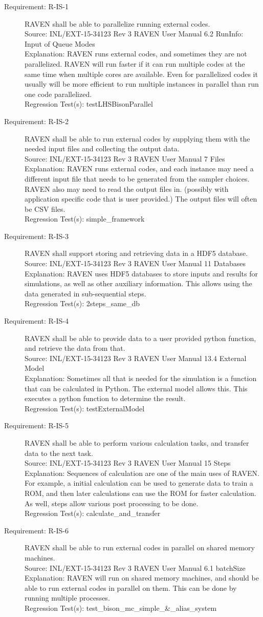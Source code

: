 \documentclass{article}
\newcommand{\requirement}[5]{\item[Requirement: #1] #2 \\Source: #3\\Explanation: #4\\Regression Test(s): #5}
\begin{document}
\begin{description}
\requirement{R-IS-1}{RAVEN shall be able to parallelize running external codes.}
{INL/EXT-15-34123 Rev 3 RAVEN User Manual 6.2 RunInfo: Input of Queue Modes}
{RAVEN runs external codes, and sometimes they are not parallelized.  RAVEN will run faster if it can run multiple codes at the same time when multiple cores are available.  Even for parallelized codes it usually will be more efficient to run multiple instances in parallel than run one code parallelized.}
{testLHSBisonParallel}

\requirement{R-IS-2}{RAVEN shall be able to run external codes by supplying them with the needed input files and collecting the output data.}
{INL/EXT-15-34123 Rev 3 RAVEN User Manual 7 Files}
{RAVEN runs external codes, and each instance may need a different input file that needs to be generated from the sampler choices.  RAVEN also may need to read the output files in. (possibly with application specific code that is user provided.)  The output files will often be CSV files.}
{simple\_framework}

\requirement{R-IS-3}{RAVEN shall support storing and retrieving data in a HDF5 database.}
{INL/EXT-15-34123 Rev 3 RAVEN User Manual 11 Databases}
{RAVEN uses HDF5 databases to store inputs and results for simulations, as well as other auxiliary information.  This allows using the data generated in sub-sequential steps.}
{2steps\_same\_db}

\requirement{R-IS-4}{RAVEN shall be able to provide data to a user provided python function, and retrieve the data from that.}
{INL/EXT-15-34123 Rev 3 RAVEN User Manual 13.4 External Model}
{Sometimes all that is needed for the simulation is a function that can be calculated in Python.  The external model allows this.  This executes a python function to determine the result.}
{testExternalModel}

\requirement{R-IS-5}{RAVEN shall be able to perform various calculation tasks, and transfer data to the next task.}
{INL/EXT-15-34123 Rev 3 RAVEN User Manual 15 Steps}
{Sequences of calculation are one of the main uses of RAVEN.  For example, a initial calculation can be used to generate data to train a ROM, and then later calculations can use the ROM for faster calculation.  As well, steps allow various post processing to be done.}
{calculate\_and\_transfer}

\requirement{R-IS-6}{RAVEN shall be able to run external codes in parallel on shared memory machines.}
{INL/EXT-15-34123 Rev 3 RAVEN User Manual 6.1 batchSize}
{RAVEN will run on shared memory machines, and should be able to run external codes in parallel on them.  This can be done by running multiple processes.}
{test\_bison\_mc\_simple\_\&\_alias\_system}


\end{description}
\end{document}
